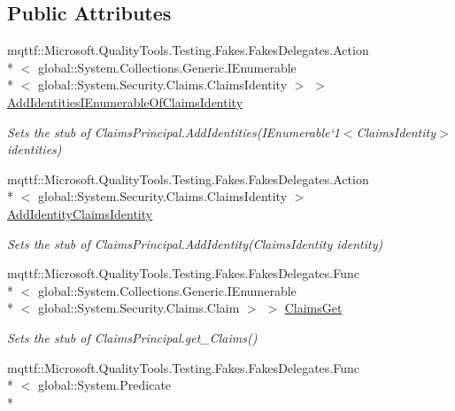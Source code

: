 \subsection*{Public Attributes}
\begin{DoxyCompactItemize}
\item 
mqttf\-::\-Microsoft.\-Quality\-Tools.\-Testing.\-Fakes.\-Fakes\-Delegates.\-Action\\*
$<$ global\-::\-System.\-Collections.\-Generic.\-I\-Enumerable\\*
$<$ global\-::\-System.\-Security.\-Claims.\-Claims\-Identity $>$ $>$ \hyperlink{class_system_1_1_security_1_1_claims_1_1_fakes_1_1_stub_claims_principal_a96c573e6c9d01dd90fdc5cd1c945bdfb}{Add\-Identities\-I\-Enumerable\-Of\-Claims\-Identity}
\begin{DoxyCompactList}\small\item\em Sets the stub of Claims\-Principal.\-Add\-Identities(I\-Enumerable`1$<$Claims\-Identity$>$ identities)\end{DoxyCompactList}\item 
mqttf\-::\-Microsoft.\-Quality\-Tools.\-Testing.\-Fakes.\-Fakes\-Delegates.\-Action\\*
$<$ global\-::\-System.\-Security.\-Claims.\-Claims\-Identity $>$ \hyperlink{class_system_1_1_security_1_1_claims_1_1_fakes_1_1_stub_claims_principal_a50b9dbdc0c22b28c6703b31894ac6457}{Add\-Identity\-Claims\-Identity}
\begin{DoxyCompactList}\small\item\em Sets the stub of Claims\-Principal.\-Add\-Identity(\-Claims\-Identity identity)\end{DoxyCompactList}\item 
mqttf\-::\-Microsoft.\-Quality\-Tools.\-Testing.\-Fakes.\-Fakes\-Delegates.\-Func\\*
$<$ global\-::\-System.\-Collections.\-Generic.\-I\-Enumerable\\*
$<$ global\-::\-System.\-Security.\-Claims.\-Claim $>$ $>$ \hyperlink{class_system_1_1_security_1_1_claims_1_1_fakes_1_1_stub_claims_principal_a70b7d63c3bbeecd74aedd83c6f12c42e}{Claims\-Get}
\begin{DoxyCompactList}\small\item\em Sets the stub of Claims\-Principal.\-get\-\_\-\-Claims()\end{DoxyCompactList}\item 
mqttf\-::\-Microsoft.\-Quality\-Tools.\-Testing.\-Fakes.\-Fakes\-Delegates.\-Func\\*
$<$ global\-::\-System.\-Predicate\\*

\end{DoxyCompactItemize}
